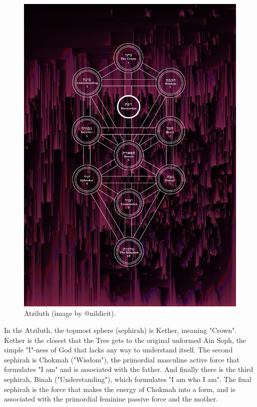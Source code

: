 \documentclass[12pt, a5paper, twoside, openright]{memoir}
\begin{document}
\begin{figure}[htp]
        \centering
        \includegraphics[width=\textwidth]{gigerkabsmol}
        \caption{Atziluth (image by @nildicit).}
\end{figure}

In the Atziluth, the topmost sphere (sephirah) is Kether, meaning "Crown". Kether is the closest that the Tree gets to the original unformed Ain Soph, the simple "I"-ness of God that lacks any way to understand itself. The second sephirah is Chokmah ("Wisdom"), the primordial masculine active force that formulates "I am" and is associated with the father. And finally there is the third sephirah, Binah ("Understanding"), which formulates "I am who I am". The final sephirah is the force that makes the energy of Chokmah into a form, and is associated with the primordial feminine passive force and the mother.
\end{document}
